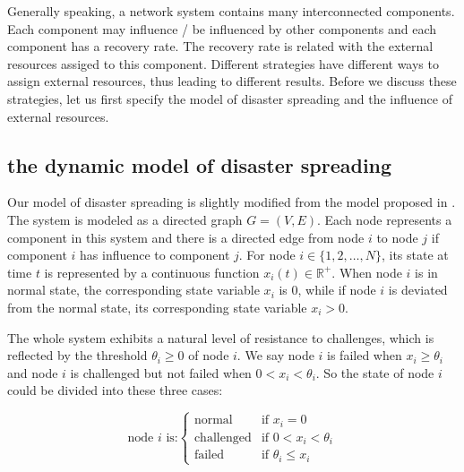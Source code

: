 Generally speaking, a network system contains many interconnected components. Each component may influence / be influenced by other components and each component has a recovery rate. The recovery rate is related with the external resources assiged to this component. Different strategies have different ways to assign external resources, thus leading to different results. Before we discuss these strategies, let us first specify the model of disaster spreading and the influence of external resources.
\subsection{the dynamic model of disaster spreading}
\label{sec:dynamicmodel}
Our model of disaster spreading is slightly modified from the model proposed in \cite{buzna2007efficient}. The system is modeled as a directed graph $G=(V, E)$. Each node represents a component in this system and there is a directed edge from node $i$ to node $j$ if component $i$ has influence to component $j$. For node $i \in \{1, 2, \ldots, N\}$, its state at time $t$ is represented by a continuous function $x_i(t) \in \mathbb{R}^{+}$. When node $i$ is in normal state, the corresponding state variable $x_i$ is $0$, while if node $i$ is deviated from the normal state, its corresponding state variable $x_i > 0$.

The whole system exhibits a natural level of resistance to challenges, which is reflected by the threshold $\theta_i \geq 0$ of node $i$. We say node $i$ is failed when $x_i \ge \theta_i$ and node $i$ is challenged but not failed when $0 < x_i < \theta_i$. So the state of node $i$ could be divided into these three cases:

\begin{equation}
	\label{eq:states}
	\text{node $i$ is:}  
		\begin{cases}
			\text{normal}  & \text{if } x_i=0 \\
			\text{challenged} & \text{if }  0 < x_i < \theta_i \\
			\text{failed} & \text{if } \theta_i \leq x_i
		\end{cases}
\end{equation}

